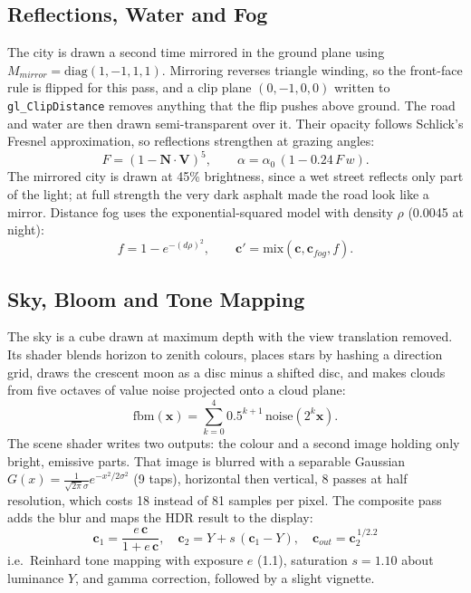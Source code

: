 \documentclass[12pt, a4paper]{report}
\begin{document}
\subsection{Reflections, Water and Fog}

\begin{justify}
  {\fontsize{12}{13.8}\selectfont
    The city is drawn a second time mirrored in the ground plane using $M_{mirror}=\mathrm{diag}(1,-1,1,1)$. Mirroring reverses triangle winding, so the front-face rule is flipped for this pass, and a clip plane $(0,-1,0,0)$ written to \texttt{gl\_ClipDistance} removes anything that the flip pushes above ground. The road and water are then drawn semi-transparent over it. Their opacity follows Schlick's Fresnel approximation, so reflections strengthen at grazing angles:
    \begin{equation}
      F=(1-\mathbf{N}\cdot\mathbf{V})^5,\qquad \alpha=\alpha_0\,(1-0.24\,F\,w).
    \end{equation}
    The mirrored city is drawn at 45\% brightness, since a wet street reflects only part of the light; at full strength the very dark asphalt made the road look like a mirror. Distance fog uses the exponential-squared model with density $\rho$ (0.0045 at night):
    \begin{equation}
      f = 1-e^{-(d\rho)^2}, \qquad \mathbf{c}' = \mathrm{mix}(\mathbf{c},\mathbf{c}_{fog},f).
    \end{equation}
  }
\end{justify}

\subsection{Sky, Bloom and Tone Mapping}

\begin{justify}
  {\fontsize{12}{13.8}\selectfont
    The sky is a cube drawn at maximum depth with the view translation removed. Its shader blends horizon to zenith colours, places stars by hashing a direction grid, draws the crescent moon as a disc minus a shifted disc, and makes clouds from five octaves of value noise projected onto a cloud plane:
    \begin{equation}
      \mathrm{fbm}(\mathbf{x})=\sum_{k=0}^{4}0.5^{k+1}\,\mathrm{noise}(2^{k}\mathbf{x}).
    \end{equation}
    The scene shader writes two outputs: the colour and a second image holding only bright, emissive parts. That image is blurred with a separable Gaussian $G(x)=\frac{1}{\sqrt{2\pi}\sigma}e^{-x^2/2\sigma^2}$ (9 taps), horizontal then vertical, 8 passes at half resolution, which costs 18 instead of 81 samples per pixel. The composite pass adds the blur and maps the HDR result to the display:
    \begin{equation}
      \mathbf{c}_1=\frac{e\,\mathbf{c}}{1+e\,\mathbf{c}},\quad
      \mathbf{c}_2=Y+s\,(\mathbf{c}_1-Y),\quad
      \mathbf{c}_{out}=\mathbf{c}_2^{\,1/2.2}
    \end{equation}
    i.e.\ Reinhard tone mapping with exposure $e$ (1.1), saturation $s=1.10$ about luminance $Y$, and gamma correction, followed by a slight vignette.
  }
\end{justify}
\end{document}
